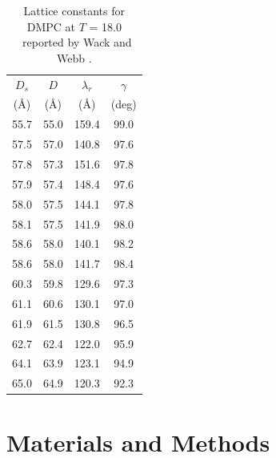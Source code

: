 \begin{table}[htbp]
\centering
  \begin{tabular}{cccc}
    \hline
    $D_s$ & $D$ & $\lambda_r$ & $\gamma$ \\
    (\AA) & (\AA) & (\AA) & (deg) \\
    \hline
    55.7 & 55.0 & 159.4 & 99.0 \\
    57.5 & 57.0 & 140.8 & 97.6 \\
    57.8 & 57.3 & 151.6 & 97.8 \\
    57.9 & 57.4 & 148.4 & 97.6 \\
    58.0 & 57.5	& 144.1 & 97.8 \\
    58.1 & 57.5 & 141.9 & 98.0 \\
    58.6 & 58.0 & 140.1 & 98.2 \\
    58.6 & 58.0 & 141.7 & 98.4 \\
    60.3 & 59.8 & 129.6 & 97.3 \\
    61.1 & 60.6 & 130.1 & 97.0 \\
    61.9 & 61.5 & 130.8 & 96.5 \\
    62.7 & 62.4 & 122.0 & 95.9 \\
    64.1 & 63.9 & 123.1 & 94.9 \\
    65.0 & 64.9 & 120.3 & 92.3 \\    
    \hline 
  \end{tabular}
  \caption{Lattice constants for DMPC at $T$ = 18.0 \textcelsius\
  reported by Wack and Webb \cite{ref:Wack89}.} 
\end{table}

\section{Materials and Methods}
